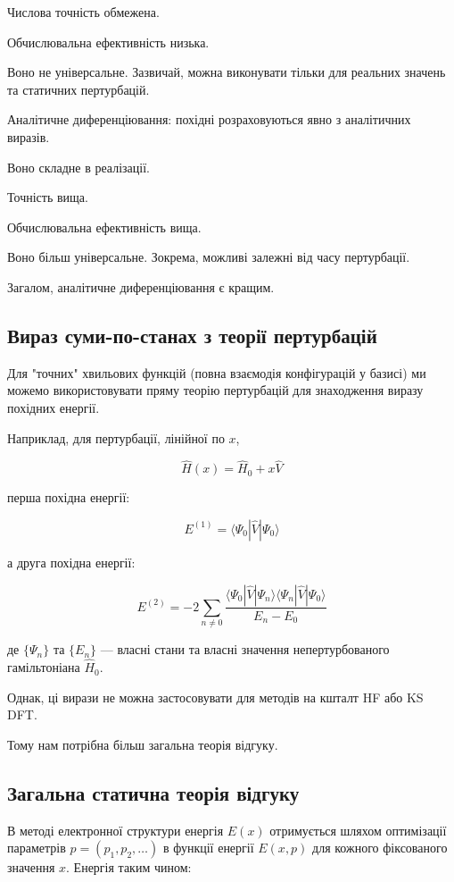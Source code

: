 \documentclass{PySCFBook}
\begin{document}
Числова точність обмежена.

Обчислювальна ефективність низька.

Воно не універсальне. Зазвичай, можна виконувати тільки для реальних значень та статичних пертурбацій.

Аналітичне диференціювання: похідні розраховуються явно з аналітичних виразів.

Воно складне в реалізації.

Точність вища.

Обчислювальна ефективність вища.

Воно більш універсальне. Зокрема, можливі залежні від часу пертурбації.

Загалом, аналітичне диференціювання є кращим.

\subsection{Вираз суми-по-станах з теорії пертурбацій}

Для "точних" хвильових функцій (повна взаємодія конфігурацій у базисі) ми можемо використовувати пряму теорію пертурбацій для знаходження виразу похідних енергії.

Наприклад, для пертурбації, лінійної по \(x\),

\[\hat{H}(x) = \hat{H}_0 + x \hat{V}\]

перша похідна енергії:

\[E^{(1)} = \langle \Psi_0 | \hat{V} | \Psi_0 \rangle\]

а друга похідна енергії:

\[E^{(2)} = -2 \sum_{n \neq 0} \frac{\langle \Psi_0 | \hat{V} | \Psi_n \rangle \langle \Psi_n | \hat{V} | \Psi_0 \rangle}{E_n - E_0}\]

де \(\{\Psi_n\}\) та \(\{E_n\}\) — власні стани та власні значення непертурбованого гамільтоніана \(\hat{H}_0\).

Однак, ці вирази не можна застосовувати для методів на кшталт HF або KS DFT.

Тому нам потрібна більш загальна теорія відгуку.

\subsection{Загальна статична теорія відгуку}

В методі електронної структури енергія \(E(x)\) отримується шляхом оптимізації параметрів \(p = (p_1, p_2, \dots)\) в функції енергії \(E(x, p)\) для кожного фіксованого значення \(x\). Енергія таким чином:
\end{document}
